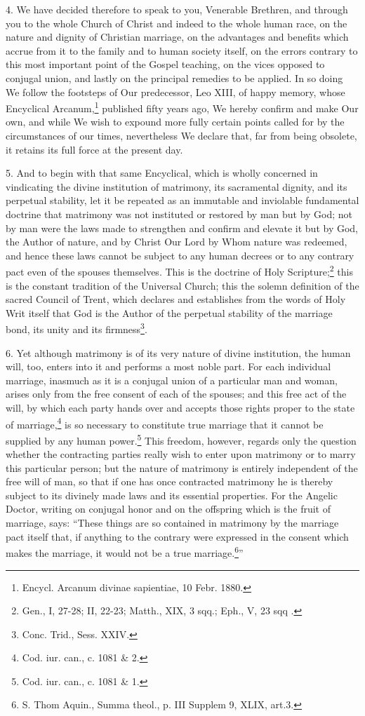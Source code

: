 \documentclass[12pt,a4paper]{book}
\begin{document}
4. We have decided therefore to speak to you, Venerable Brethren, and through you to the whole Church of Christ and indeed to the whole human race, on the nature and dignity of Christian marriage, on the advantages and benefits which accrue from it to the family and to human society itself, on the errors contrary to this most important point of the Gospel teaching, on the vices opposed to conjugal union, and lastly on the principal remedies to be applied. In so doing We follow the footsteps of Our predecessor, Leo XIII, of happy memory, whose Encyclical Arcanum,\footnote{Encycl. Arcanum divinae sapientiae, 10 Febr. 1880.} published fifty years ago, We hereby confirm and make Our own, and while We wish to expound more fully certain points called for by the circumstances of our times, nevertheless We declare that, far from being obsolete, it retains its full force at the present day.

5. And to begin with that same Encyclical, which is wholly concerned in vindicating the divine institution of matrimony, its sacramental dignity, and its perpetual stability, let it be repeated as an immutable and inviolable fundamental doctrine that matrimony was not instituted or restored by man but by God; not by man were the laws made to strengthen and confirm and elevate it but by God, the Author of nature, and by Christ Our Lord by Whom nature was redeemed, and hence these laws cannot be subject to any human decrees or to any contrary pact even of the spouses themselves. This is the doctrine of Holy Scripture;\footnote{Gen., I, 27-28; II, 22-23; Matth., XIX, 3 sqq.; Eph., V, 23 sqq .} this is the constant tradition of the Universal Church; this the solemn definition of the sacred Council of Trent, which declares and establishes from the words of Holy Writ itself that God is the Author of the perpetual stability of the marriage bond, its unity and its firmness\footnote{Conc. Trid., Sess. XXIV.}.

6. Yet although matrimony is of its very nature of divine institution, the human will, too, enters into it and performs a most noble part. For each individual marriage, inasmuch as it is a conjugal union of a particular man and woman, arises only from the free consent of each of the spouses; and this free act of the will, by which each party hands over and accepts those rights proper to the state of marriage,\footnote{Cod. iur. can., c. 1081 \& 2.} is so necessary to constitute true marriage that it cannot be supplied by any human power.\footnote{Cod. iur. can., c. 1081 \& 1.} This freedom, however, regards only the question whether the contracting parties really wish to enter upon matrimony or to marry this particular person; but the nature of matrimony is entirely independent of the free will of man, so that if one has once contracted matrimony he is thereby subject to its divinely made laws and its essential properties. For the Angelic Doctor, writing on conjugal honor and on the offspring which is the fruit of marriage, says: ``These things are so contained in matrimony by the marriage pact itself that, if anything to the contrary were expressed in the consent which makes the marriage, it would not be a true marriage.\footnote{S. Thom Aquin., Summa theol., p. III Supplem 9, XLIX, art.3.}''
\end{document}
